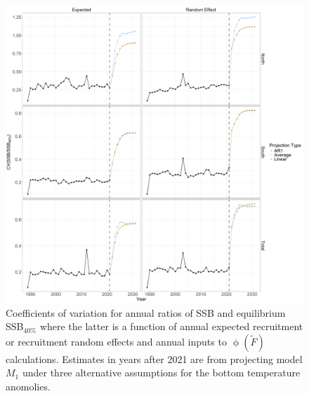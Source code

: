 \documentclass[
]{article}
\providecommand{\DIFaddbegin}{} %
\newcommand{\DIFaddincludegraphics}[2][]{{\color{blue}\fbox{\DIFOincludegraphics[#1]{#2}}}} %
\DeclareRobustCommand{\DIFaddbegin}{\DIFOaddbegin \let\includegraphics\DIFaddincludegraphics} %
\begin{document}
\begin{figure}

{\centering \includegraphics[height=0.95\textheight]{proj_SSB_status_CV} 

}

\caption{Coefficients of variation for annual ratios of SSB and equilibrium SSB$_{40\%}$ where the latter is a function of annual expected recruitment or recruitment random effects and annual inputs to $\upphi(\widetilde{F})$ calculations. Estimates in years after 2021 are from projecting model $M_1$ under three alternative assumptions for the bottom temperature anomolies.}\label{fig:annual-SSB-status-cvs}
\end{figure}
\DIFaddbegin 
\end{document}
